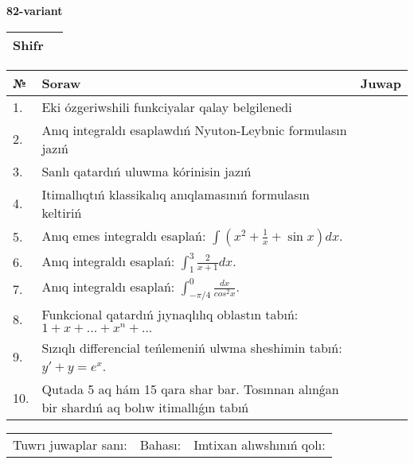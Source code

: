 \documentclass{article}
\begin{document}
  \egroup
  
  \newpage
  
  
  \textbf{82-variant}\\
  
  \bgroup
  \def\arraystretch{1.6} %
  
  \begin{tabular}{|m{5.7cm}|m{9.5cm}|}
  \hline
  Shifr & \\
  \hline
  \end{tabular}
  
  \vspace{1cm}
  
  \begin{tabular}{|m{0.7cm}|m{10cm}|m{4cm}|}
  \hline
  № & Soraw & Juwap \\
  \hline
  1. & Eki ózgeriwshili funkciyalar qalay belgilenedi &  \\
  \hline
  2. & Anıq integraldı esaplawdıń Nyuton-Leybnic formulasın jazıń &  \\
  \hline
  3. & Sanlı qatardıń uluwma kórinisin jazıń &  \\
  \hline
  4. & Itimallıqtıń klassikalıq anıqlamasınıń formulasın keltiriń &  \\
  \hline
  5. & Anıq emes integraldı esaplań: \(\int{\left( x^2  + \frac{1}{x} + \sin x \right)dx}\). &  \\
  \hline
  6. & Anıq integraldı esaplań: \(\int_{1}^{3}\frac{2}{x + 1}dx\). &  \\
  \hline
  7. & Anıq integraldı esaplań: \(\int_{- \pi/4}^{0}\frac{dx}{cos^2 x}\). &  \\
  \hline
  8. & Funkcional qatardıń jıynaqlılıq oblastın tabıń:\(1 + x + ... + x^{n} + ...\) &  \\
  \hline
  9. & Sızıqlı differencial teńlemeniń ulwma sheshimin tabıń: \(y' + y = e^{x}\). &  \\
  \hline
  10. & Qutada 5 aq hám 15 qara shar bar. Tosınnan alınǵan bir shardıń aq bolıw itimallıǵın tabıń &  \\
  \hline
  \end{tabular}
  
  \vspace{1cm}
  
  \begin{tabular}{lll}
  Tuwrı juwaplar sanı: \underline{\hspace{1.5cm}} & 
  Bahası: \underline{\hspace{1.5cm}} & 
  Imtixan alıwshınıń qolı: \underline{\hspace{2cm}} \\
  \end{tabular}
  
\end{document}
